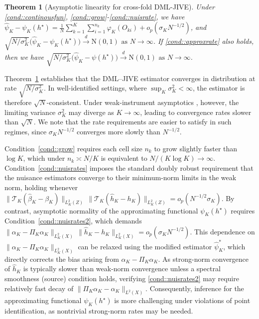 \documentclass[11pt]{article}
\theoremstyle{plain}
\newtheorem{theorem}{Theorem}
\theoremstyle{definition}
\theoremstyle{remark}
\theoremstyle{definition}
\begin{document}
 \begin{theorem}[Asymptotic linearity for cross-fold DML-JIVE]
 Under \ref{cond::continousfun},  \ref{cond::grow}-\ref{cond::nuisrate}, we have  \(\widehat{\psi}_K - \psi_K(h^\star) = \frac{1}{N} \sum_{k=1}^K \sum_{i=1}^{n_k}  \varphi_K(O_{ki}) + o_p(\sigma_K N^{-1/2})\),  and  \(\sqrt{N/\sigma_K^{2}} \big( \widehat{\psi}_K - \psi_K(h^\star) \big) \overset{d}{\to} \text{N}(0,1) \text{ as } N \to \infty\).  If \ref{cond::approxrate} also holds, then we have \(\sqrt{N/\sigma_K^{2}} \big( \widehat{\psi}_K - \psi(h^\star) \big) \overset{d}{\to} \text{N}(0,1) \text{ as } N \to \infty\). %
 \label{theorem::asymnormal}
\end{theorem}

Theorem~\ref{theorem::asymnormal} establishes that the DML--JIVE estimator
converges in distribution at rate \(\sqrt{N/\sigma_K^2}\). In well-identified
settings, where \(\sup_K \sigma_K^2 < \infty\), the estimator is therefore
\(\sqrt{N}\)-consistent. Under weak-instrument asymptotics
\citep{bound1995problems}, however, the limiting variance \(\sigma_K^2\) may
diverge as \(K \to \infty\), leading to convergence rates slower than
\(\sqrt{N}\). We note that the rate requirements are easier to satisfy in such
regimes, since \(\sigma_K N^{-1/2}\) converges more slowly than \(N^{-1/2}\).





Condition~\ref{cond::grow} requires each cell size \(n_k\) to grow slightly
faster than \(\log K\), which under \(n_k \asymp N/K\) is equivalent to
\(N/(K \log K) \to \infty\). Condition~\ref{cond::nuisrates} imposes the
standard doubly robust requirement that the nuisance estimators converge to
their minimum-norm limits in the weak norm, holding whenever
\(\|\mathcal{T}_{K}(\widehat{\beta}_K - \beta_{K})\|_{L^2_K(Z)}\,
\|\mathcal{T}_{K}(\widehat{h}_K - h_{K})\|_{L^2_K(Z)}
= o_p(N^{-1/2}\sigma_K)\). By contrast, asymptotic normality of the approximating functional
\(\psi_K(h^\star)\) requires Condition~\ref{cond::nuisrates2}, which demands
\(\|\alpha_K - \Pi_K \alpha_K\|_{L^2_K(X)}\,
\|\widehat{h}_K - h_{K}\|_{L^2_K(X)} = o_p(\sigma_K N^{-1/2})\). This dependence
on \(\|\alpha_K - \Pi_K \alpha_K\|_{L^2_K(X)}\) can be relaxed using the
modified estimator \(\widehat{\psi}_K^*\), which directly corrects the bias
arising from \(\alpha_K - \Pi_K \alpha_K\). As
strong-norm convergence of \(\widehat{h}_K\) is typically slower than
weak-norm convergence unless a spectral smoothness (source) condition holds,
verifying \ref{cond::nuisrates2} may require relatively fast decay of
\(\|\Pi_K \alpha_K - \alpha_K\|_{L^2(X)}\). Consequently, inference for the
approximating functional \(\psi_K(h^\star)\) is more challenging under
violations of point identification, as nontrivial strong-norm rates may be needed.  
\end{document}
